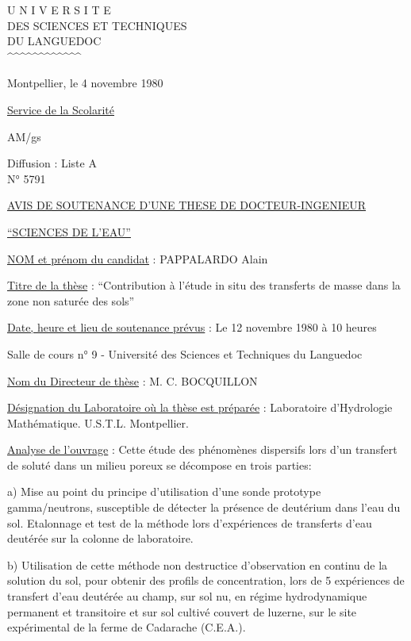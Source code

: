 \begin{center}
U N I V E R S I T E\\
DES SCIENCES ET TECHNIQUES\\
DU LANGUEDOC\\
\textasciicircum\textasciicircum\textasciicircum\textasciicircum\textasciicircum\textasciicircum\textasciicircum\textasciicircum\textasciicircum\textasciicircum\textasciicircum\textasciicircum
\end{center}
Montpellier, le 4 novembre 1980

\uline{Service de la Scolarité}

AM/gs

Diffusion : Liste A\\
N° 5791

\begin{center}
\uline{AVIS DE SOUTENANCE D'UNE THESE DE DOCTEUR-INGENIEUR}

\uline{``SCIENCES DE L'EAU''}
\end{center}

\uline{NOM et prénom du candidat} : PAPPALARDO Alain

\uline{Titre de la thèse} : ``Contribution à l'étude in situ des transferts de masse dans la zone non saturée des sols''

\uline{Date, heure et lieu de soutenance prévus} : Le 12 novembre 1980 à 10 heures

Salle de cours n° 9 - Université des Sciences et Techniques du Languedoc

\uline{Nom du Directeur de thèse} : M. C. BOCQUILLON

\uline{Désignation du Laboratoire où la thèse est préparée} : Laboratoire d'Hydrologie Mathématique. U.S.T.L. Montpellier.

\uline{Analyse de l'ouvrage} : Cette étude des phénomènes dispersifs lors d'un transfert de soluté dans un milieu poreux se décompose en trois parties:

a) Mise au point du principe d'utilisation d'une sonde prototype gamma/neutrons, susceptible de détecter la présence de deutérium dans l'eau du sol. Etalonnage et test de la méthode lors d'expériences de transferts d'eau deutérée sur la colonne de laboratoire.

b) Utilisation de cette méthode non destructice d'observation en continu de la solution du sol, pour obtenir des profils de concentration, lors de 5 expériences de transfert d'eau deutérée au champ, sur sol nu, en régime hydrodynamique permanent et transitoire et sur sol cultivé couvert de luzerne, sur le site expérimental de la ferme de Cadarache (C.E.A.).

